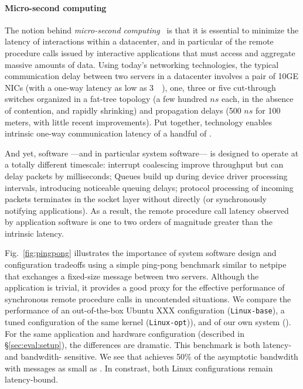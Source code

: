 \paragraph{Micro-second computing}

The notion behind \emph{micro-second computing}~\cite{luiz-isscc} is
that it is essential to minimize the latency of interactions within a
datacenter, and in particular of the remote procedure calls issued by
interactive applications that must access and aggregate massive
amounts of data.  Using today's networking technologies, the typical
communication delay between two servers in a datacenter involves a
pair of 10GE NICs (with a one-way latency as low as
3~\microsecond~\cite{cisco-sereno}), one, three or five cut-through
switches organized in a fat-tree topology (a few hundred $ns$ each, in
the absence of contention, and rapidly shrinking) and propagation
delays (500 $ns$ for 100 meters, with little recent improvements).
Put together, technology enables intrinsic one-way communication
latency of a handful of \microsecond.  

And yet, software ---and in particular system software--- is designed
to operate at a totally different timescale: interrupt coalescing
improve throughput but can delay packets by milliseconds; Queues build
up during device driver processing intervals, introducing noticeable
queuing delays; protocol processing of incoming packets terminates in
the socket layer without directly (or synchronously notifying
applications).  As a result, the remote procedure call latency
observed by application software is one to two orders of magnitude
greater than the intrinsic latency.



Fig.~\ref{fig:pingpong} illustrates the importance of system software
design and configuration tradeoffs using a simple ping-pong benchmark
similar to netpipe~\cite{snell1996netpipe} that exchanges a fixed-size
message between two servers.  Although the application is trivial, it
provides a good proxy for the effective performance of synchronous
remote procedure calls in uncontended situations.  We compare the
performance of an out-of-the-box Ubuntu XXX configuration
(\texttt{Linux-base}), a tuned configuration of the same kernel
(\texttt{Linux-opt})), and of our own system (\ix).  For the same
application and hardware configuration (described in
\S\ref{sec:eval:setup}), the differences are dramatic.  This
benchmark is both latency- and bandwdith- sensitive.  We see that \ix
achieves 50\% of the asymptotic bandwdith with messages as small as
.  In constrast, both Linux configurations remain
latency-bound.



